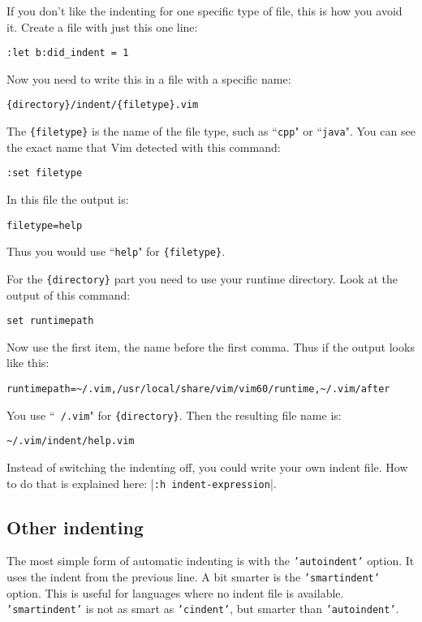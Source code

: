 If you don't like the indenting for one specific type of file, this is how you avoid it.
Create a file with just this one line:

\begin{Verbatim}[samepage=true]
 :let b:did_indent = 1
\end{Verbatim}

Now you need to write this in a file with a specific name:

\begin{Verbatim}[samepage=true]
    {directory}/indent/{filetype}.vim
\end{Verbatim}

The \texttt{\{filetype\}} is the name of the file type, such as ``\texttt{cpp}" or ``\texttt{java}".
You can see the exact name that Vim detected with this command:

\begin{Verbatim}[samepage=true]
 :set filetype
\end{Verbatim}

In this file the output is:

\begin{Verbatim}[samepage=true]
    filetype=help
\end{Verbatim}

Thus you would use ``\texttt{help}" for \texttt{\{filetype\}}.

For the \texttt{\{directory\}} part you need to use your runtime directory.
Look at the output of this command:

\begin{Verbatim}[samepage=true]
 set runtimepath
\end{Verbatim}

Now use the first item, the name before the first comma.
Thus if the output looks like this:

\begin{Verbatim}[samepage=true]
    runtimepath=~/.vim,/usr/local/share/vim/vim60/runtime,~/.vim/after
\end{Verbatim}

You use ``\texttt{~/.vim}" for \texttt{\{directory\}}.
Then the resulting file name is:

\begin{Verbatim}[samepage=true]
    ~/.vim/indent/help.vim
\end{Verbatim}

Instead of switching the indenting off, you could write your own indent file.
How to do that is explained here: |\texttt{:h indent-expression}|.
\subsection{Other indenting}
The most simple form of automatic indenting is with the \texttt{'autoindent'} option.
It uses the indent from the previous line.
A bit smarter is the \texttt{'smartindent'} option.
This is useful for languages where no indent file is available.
\texttt{'smartindent'} is not as smart as \texttt{'cindent'}, but smarter than \texttt{'autoindent'}.

